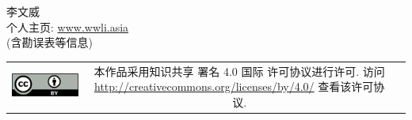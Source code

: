 \begin{titlepage}
\begin{flushleft} \small
	李文威 \\
	个人主页: \href{https://www.wwli.asia}{www.wwli.asia} \\
	(含勘误表等信息)
\end{flushleft}
\vspace{1.5em}
\begin{tabular*}{\textwidth}{ccc}
	\includegraphics{ccby.png}
	& \begin{minipage}[b]{0.6\textwidth}
		\small\sffamily
		本作品采用知识共享 署名 4.0 国际 许可协议进行许可. 访问 \url{http://creativecommons.org/licenses/by/4.0/} 查看该许可协议.
	\end{minipage}
\end{tabular*}

\cleardoublepage
\end{titlepage}
